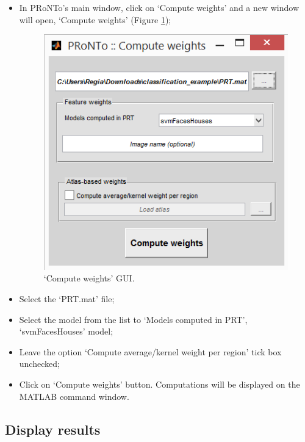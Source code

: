 \begin{itemize}
\item In PRoNTo's main window, click on `Compute weights' and a new window will open, `Compute weights' (Figure \ref{fig:computeWeights});

\begin{figure}[h!]
	\centering
		\includegraphics[scale=0.7]{images/Tutorial/classification/computeWeights.png}
	\caption{`Compute weights' GUI.}
	\label{fig:computeWeights}
\end{figure}

\item Select the `PRT.mat' file;

\item Select the model from the list to `Models computed in PRT', `svmFacesHouses' model;

\item Leave the option `Compute average/kernel weight per region' tick box unchecked;

\item Click on `Compute weights' button. Computations will be displayed on the MATLAB command window.

\end{itemize}


\subsection{Display results}
\label{display_results}

